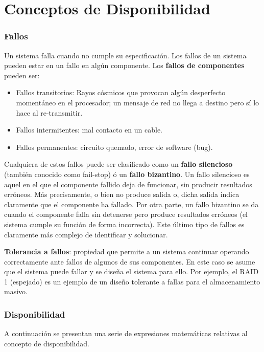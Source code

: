 \section{Conceptos de Disponibilidad}

	
\subsubsection*{Fallos}  
	Un sistema falla cuando no cumple su especificación. Los fallos de un sistema pueden estar en un fallo en algún componente. Los {\bf fallos de componentes} pueden ser: 
	\begin{itemize}
	\item Fallos transitorios: Rayos cósmicos que provocan algún desperfecto momentáneo en el procesador; un mensaje de red no llega a destino pero sí lo hace al re-transmitir. 
	\item Fallos intermitentes: mal contacto en un cable. 
	\item Fallos permanentes: circuito quemado, error de software (bug).
	\end{itemize}
	
	Cualquiera de estos fallos puede ser clasificado como un {\bf fallo silencioso} (también conocido como fail-stop) ó un {\bf fallo bizantino}. Un fallo silencioso es aquel en el que el componente fallido deja de funcionar, sin producir resultados erróneos. Más precisamente, o bien no produce salida o, dicha salida indica claramente que el componente ha fallado. Por otra parte, un fallo bizantino se da cuando el componente falla sin detenerse pero produce resultados erróneos (el sistema cumple su función de forma incorrecta). Este último tipo de fallos es claramente más complejo de identificar y solucionar. 

{\bf Tolerancia a fallos}: propiedad que permite a un sistema continuar operando correctamente ante fallos de algunos de sus componentes. En este caso se 
asume que el sistema puede fallar y se diseña el sistema para ello. Por ejemplo, el RAID 1 (espejado) es un ejemplo de un diseño tolerante a fallas para el 
almacenamiento masivo. 

\subsubsection*{Disponibilidad}
A continuación se presentan una serie de expresiones matemáticas relativas al 
concepto de disponibilidad. 

